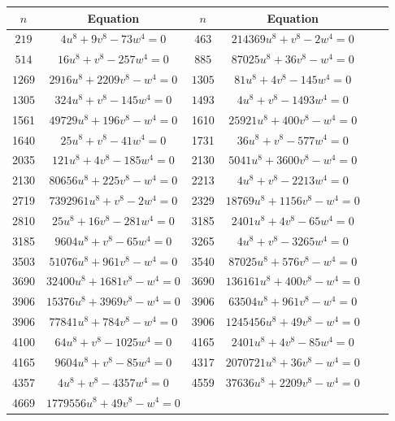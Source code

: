 \documentclass[a4paper,12pt,english,reqno]{amsart}
\begin{document}
\begin{table}
\begin{center}
\begin{tabular}{|c|c||c|c|c|c|}
	\hline
	$n$  & Equation & $n$  & Equation  \\\hline \hline
    $219$ & $4u^8 + 9v^8 - 73w^4=0$ &
    $463$ & $214369 u^8 + v^8 - 2 w^4=0$ \\\hline
   $514$ & $16u^8+v^8-257w^4=0$ &
   $885$ & $87025u^8+36v^8-w^4=0$ \\\hline
$1269$ & $2916 u^8 + 2209 v^8 -  w^4=0$  &
$1305$ & $81 u^8 + 4 v^8 - 145  w^4=0$ \\\hline
$1305$ & $324 u^8 + v^8 - 145  w^4=0$  &
$1493$ & $4 u^8 + v^8 - 1493  w^4=0$ \\\hline
 1561 & $49729 u^8 + 196 v^8 -  w^4=0$ &
 1610 & $25921 u^8 + 400 v^8 -  w^4=0$ \\\hline
1640 & $25 u^8 + v^8 - 41  w^4=0$ &
 1731 & $36 u^8 + v^8 - 577  w^4=0$ \\\hline 
 2035 & $121 u^8 + 4 v^8 - 185  w^4=0$ &
 2130 & $5041 u^8 + 3600 v^8 -  w^4=0$ \\\hline
 2130 & $80656 u^8 + 225 v^8 -  w^4=0$ &
2213 & $4 u^8+v^8 -2213  w^4=0$  \\\hline
 2719 & $7392961 u^8 + v^8 - 2  w^4=0$ &
 2329 & $18769 u^8 + 1156 v^8 -  w^4=0$  \\\hline
 2810 & $ 25 u^8 + 16 v^8 - 281  w^4=0$ &
 3185 & $2401 u^8 + 4 v^8 - 65  w^4=0$ \\\hline
 3185 & $9604 u^8 + v^8 - 65  w^4=0$ &
 3265 & $4 u^8 + v^8 - 3265  w^4=0$ \\\hline
 3503 & $51076 u^8 + 961 v^8 -  w^4=0$ & 
 3540 & $87025 u^8 + 576 v^8 -  w^4=0$  \\\hline
3690 & $32400 u^8 + 1681 v^8 -  w^4=0$ &
3690 & $136161 u^8 + 400 v^8 -  w^4=0$ \\\hline
3906 & $15376 u^8 + 3969 v^8 -  w^4=0$ &
3906 & $63504 u^8 + 961 v^8 -  w^4=0$  \\\hline
3906 & $77841 u^8 + 784 v^8 -  w^4=0$&
3906 & $1245456 u^8 + 49 v^8 -  w^4=0$ \\\hline
 4100 & $64 u^8 + v^8 - 1025  w^4=0 $ & 
4165 & $2401 u^8 + 4 v^8 - 85  w^4=0$  \\\hline
4165 & $9604 u^8 + v^8 - 85  w^4=0$ &
 4317 & $2070721 u^8+36 v^8- w^4=0$ \\\hline
 4357 & $4 u^8 + v^8 - 4357  w^4=0$ &
 4559 &$ 37636 u^8 + 2209 v^8 -  w^4=0$  \\\hline
 4669& $ 1779556u^8+49v^8- w^4=0 $ &

\end{tabular}
\end{center}
\end{table}
\end{document}

